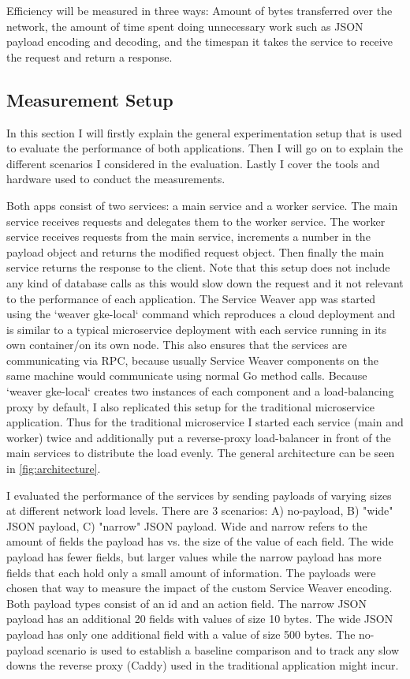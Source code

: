 \documentclass[sigconf,review,9pt]{acmart}
\begin{document}
Efficiency will be measured in three ways: Amount of bytes transferred over
the network, the amount of time spent doing unnecessary work such as
JSON payload encoding and decoding, and the timespan it takes the
service to receive the request and return a response.

\subsection{Measurement Setup}

In this section I will firstly explain the general experimentation setup that is
used to evaluate the performance of both applications.
Then I will go on to explain the different scenarios I considered in the evaluation.
Lastly I cover the tools and hardware used to conduct the measurements.

Both apps consist of two services: a main service and a worker service.
The main service receives requests and delegates them to the worker service.
The worker service receives requests from the main service, increments a number in the payload
object and returns the modified request object.
Then finally the main service returns the response to the client.
Note that this setup does not include any kind of database calls as this would slow
down the request and it not relevant to the performance of each application.
The Service Weaver app was started using the `weaver gke-local` command which reproduces a
cloud deployment and is similar to a typical microservice deployment with each service running in
its own container/on its own node.
This also ensures that the services are communicating via RPC, because usually Service Weaver
components on the same machine would communicate using normal Go method calls.
Because `weaver gke-local` creates two instances of each component and a load-balancing
proxy by default, I also replicated this setup for the traditional microservice application.
Thus for the traditional microservice I started each service (main and worker) twice
and additionally put a reverse-proxy load-balancer \cite{serverCaddyUltimateServer}
in front of the main services to distribute the load evenly.
The general architecture can be seen in \ref{fig:architecture}.

I evaluated the performance of the services by sending payloads of varying sizes
at different network load levels.
There are 3 scenarios: A) no-payload, B) "wide" JSON payload, C) "narrow" JSON payload.
Wide and narrow refers to the amount of fields the payload has vs. the size of the
value of each field.
The wide payload has fewer fields, but larger values while the narrow payload
has more fields that each hold only a small amount of information.
The payloads were chosen that way to measure the impact of the custom Service
Weaver encoding.
Both payload types consist of an id and an action field.
The narrow JSON payload has an additional 20 fields with values of size 10 bytes.
The wide JSON payload has only one additional field with a value of size 500 bytes.
The no-payload scenario is used to establish a baseline comparison and to track
any slow downs the reverse proxy (Caddy) used in the traditional application
might incur.
\end{document}
